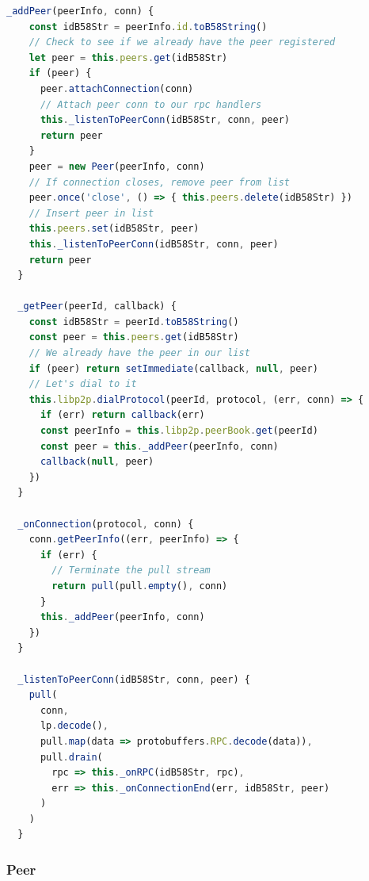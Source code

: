 \begin{lstlisting}[language=JavaScript, float=p, caption={Pulsarcast internal peer and connection handlers. These methods abstract the logic of connection handling to all the other parts of the Pulsarcast system.},label={pulsarcast-connection-handlers}]
  _addPeer(peerInfo, conn) {
    const idB58Str = peerInfo.id.toB58String()
    // Check to see if we already have the peer registered
    let peer = this.peers.get(idB58Str)
    if (peer) {
      peer.attachConnection(conn)
      // Attach peer conn to our rpc handlers
      this._listenToPeerConn(idB58Str, conn, peer)
      return peer
    }
    peer = new Peer(peerInfo, conn)
    // If connection closes, remove peer from list
    peer.once('close', () => { this.peers.delete(idB58Str) })
    // Insert peer in list
    this.peers.set(idB58Str, peer)
    this._listenToPeerConn(idB58Str, conn, peer)
    return peer
  }

  _getPeer(peerId, callback) {
    const idB58Str = peerId.toB58String()
    const peer = this.peers.get(idB58Str)
    // We already have the peer in our list
    if (peer) return setImmediate(callback, null, peer)
    // Let's dial to it
    this.libp2p.dialProtocol(peerId, protocol, (err, conn) => {
      if (err) return callback(err)
      const peerInfo = this.libp2p.peerBook.get(peerId)
      const peer = this._addPeer(peerInfo, conn)
      callback(null, peer)
    })
  }

  _onConnection(protocol, conn) {
    conn.getPeerInfo((err, peerInfo) => {
      if (err) {
        // Terminate the pull stream
        return pull(pull.empty(), conn)
      }
      this._addPeer(peerInfo, conn)
    })
  }

  _listenToPeerConn(idB58Str, conn, peer) {
    pull(
      conn,
      lp.decode(),
      pull.map(data => protobuffers.RPC.decode(data)),
      pull.drain(
        rpc => this._onRPC(idB58Str, rpc),
        err => this._onConnectionEnd(err, idB58Str, peer)
      )
    )
  }
\end{lstlisting}

\subsubsection{Peer}\label{subsubsec:peer}

